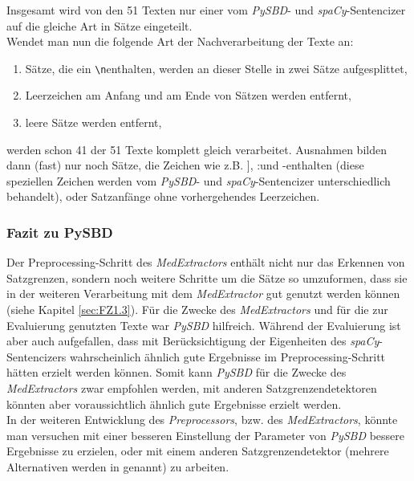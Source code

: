 Insgesamt wird von den 51 Texten nur einer vom \emph{PySBD}- und \emph{spaCy}-Sentencizer auf die gleiche Art in Sätze eingeteilt.\\
Wendet man nun die folgende Art der Nachverarbeitung der Texte an:
\begin{enumerate}
	\item Sätze, die ein \glqq \verb!\n!\grqq enthalten, werden an dieser Stelle in zwei Sätze aufgesplittet,
	\item Leerzeichen am Anfang und am Ende von Sätzen werden entfernt,
	\item leere Sätze werden entfernt,
\end{enumerate}
 werden schon 41 der 51 Texte komplett gleich verarbeitet. Ausnahmen bilden dann (fast) nur noch Sätze, die Zeichen wie z.B. \glqq ]\grqq, \glqq :\grqq und \glqq -\grqq enthalten (diese speziellen Zeichen werden vom \emph{PySBD}- und \emph{spaCy}-Sentencizer unterschiedlich behandelt), oder Satzanfänge ohne vorhergehendes Leerzeichen.\\

 
\subsubsection{Fazit zu PySBD}
Der Preprocessing-Schritt des \emph{MedExtractors} enthält nicht nur das Erkennen von Satzgrenzen, sondern noch weitere Schritte um die Sätze so umzuformen, dass sie in der weiteren Verarbeitung mit dem \emph{MedExtractor} gut genutzt werden können (siehe Kapitel \ref{sec:FZ1.3}). Für die Zwecke des \emph{MedExtractors} und für die zur Evaluierung genutzten Texte war \emph{PySBD} hilfreich. Während der Evaluierung ist aber auch aufgefallen, dass mit Berücksichtigung der Eigenheiten des \emph{spaCy}-Sentencizers wahrscheinlich ähnlich gute Ergebnisse im Preprocessing-Schritt hätten erzielt werden können. Somit kann \emph{PySBD} für die Zwecke des \emph{MedExtractors} zwar empfohlen werden, mit anderen Satzgrenzendetektoren könnten aber voraussichtlich ähnlich gute Ergebnisse erzielt werden. \\
In der weiteren Entwicklung des \emph{Preprocessors}, bzw. des \emph{MedExtractors}, könnte man versuchen mit einer besseren Einstellung der Parameter von \emph{PySBD} bessere Ergebnisse zu erzielen, oder mit einem anderen Satzgrenzendetektor (mehrere Alternativen werden in \cite{sadvilkar_pysbd_2020} genannt) zu arbeiten.

